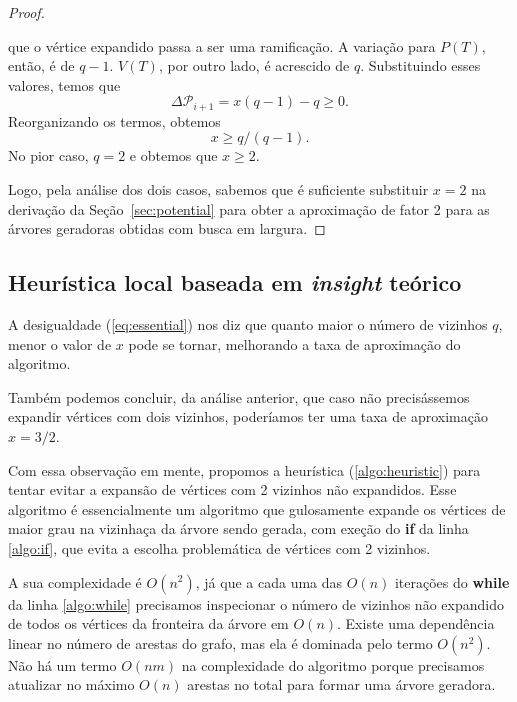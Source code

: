 \documentclass[conference]{IEEEtran}
\begin{document}
\begin{proof}
\begin{itemize}
      que o v\'ertice expandido passa a ser uma ramifica\c{c}\~ao. A varia\c{c}\~ao para $P(T)$,
      ent\~ao, \'e de $q - 1$. $V(T)$, por outro lado, \'e acrescido de $q$. Substituindo esses
      valores, temos que
      \begin{equation}
        \Delta \mathcal{P}_{i + 1} = x(q - 1) - q \ge 0.
      \end{equation}
      Reorganizando os termos, obtemos
      \begin{equation} \label{eq:essential}
        x \ge q/(q - 1).
      \end{equation}
      No pior caso, $q = 2$ e obtemos que $x \ge 2$.
  \end{itemize}
  Logo, pela an\'alise dos dois casos, sabemos que \'e suficiente substituir $x = 2$ na
  deriva\c{c}\~ao da Se\c{c}\~ao~\ref{sec:potential} para obter a aproxima\c{c}\~ao de fator 2 para
  as \'arvores geradoras obtidas com busca em largura.
\end{proof}

\subsection{Heur\'istica local baseada em \textit{insight} te\'orico}
A desigualdade (\ref{eq:essential}) nos diz que quanto maior o n\'umero de vizinhos $q$, menor o
valor de $x$ pode se tornar, melhorando a taxa de aproxima\c{c}\~ao do algoritmo.

Tamb\'em podemos concluir, da an\'alise anterior, que caso n\~ao precis\'assemos expandir v\'ertices
com dois vizinhos, poder\'iamos ter uma taxa de aproxima\c{c}\~ao $x = 3/2$.

Com essa observa\c{c}\~ao em mente, propomos a heur\'istica (\ref{algo:heuristic}) para tentar evitar a expans\~ao de v\'ertices com 2 vizinhos n\~ao expandidos. Esse algoritmo \'e essencialmente um
algoritmo que gulosamente expande os v\'ertices de maior grau na vizinha\c{c}a da \'arvore sendo
gerada, com exe\c{c}\~ao do \textbf{if} da linha \ref{algo:if}, que evita a escolha problem\'atica de
v\'ertices com 2 vizinhos.

A sua complexidade \'e $O(n^2)$, j\'a que a cada uma das $O(n)$ itera\c{c}\~oes do \textbf{while} da linha \ref{algo:while} precisamos inspecionar o n\'umero de vizinhos n\~ao expandido de todos os v\'ertices da fronteira da \'arvore em $O(n)$. Existe uma depend\^encia linear no n\'umero de arestas do
grafo, mas ela \'e dominada pelo termo $O(n^2)$. N\~ao h\'a um termo $O(nm)$ na complexidade do
algoritmo porque precisamos atualizar no m\'aximo $O(n)$ arestas no total para formar uma \'arvore
geradora.
\end{document}
